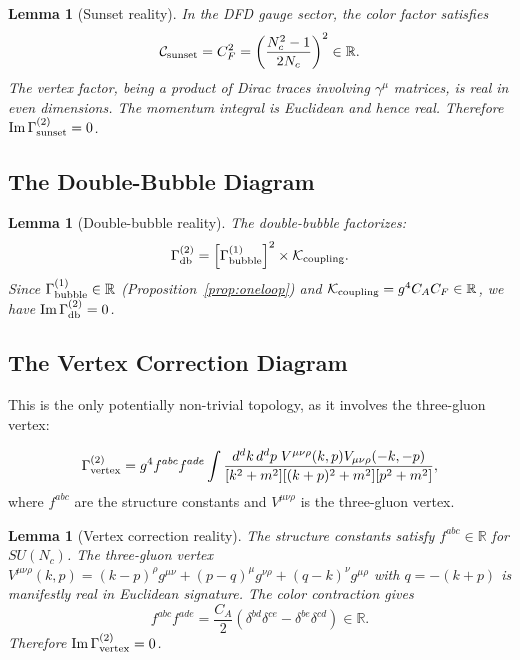\documentclass[11pt,a4paper]{article}
\newtheorem{lemma}[theorem]{Lemma}
\theoremstyle{remark}
\begin{document}
\begin{lemma}[Sunset reality]
\label{lem:sunset}
In the DFD gauge sector, the color factor satisfies
\begin{equation}
\mathcal{C}_{\rm sunset} = C_F^2 = \left(\frac{N_c^2-1}{2N_c}\right)^2 \in \mathbb{R}.
\end{equation}
The vertex factor, being a product of Dirac traces involving $\gamma^\mu$
matrices, is real in even dimensions. The momentum integral is Euclidean
and hence real. Therefore $\mathrm{Im}\,\Gamma^{(2)}_{\rm sunset} = 0$.
\end{lemma}

\subsection{The Double-Bubble Diagram}

\begin{lemma}[Double-bubble reality]
\label{lem:doublebubble}
The double-bubble factorizes:
\begin{equation}
\Gamma^{(2)}_{\rm db} = \left[\Gamma^{(1)}_{\rm bubble}\right]^2 \times \mathcal{K}_{\rm coupling}.
\end{equation}
Since $\Gamma^{(1)}_{\rm bubble} \in \mathbb{R}$ (Proposition~\ref{prop:oneloop})
and $\mathcal{K}_{\rm coupling} = g^4 C_A C_F \in \mathbb{R}$, we have
$\mathrm{Im}\,\Gamma^{(2)}_{\rm db} = 0$.
\end{lemma}

\subsection{The Vertex Correction Diagram}

This is the only potentially non-trivial topology, as it involves the
three-gluon vertex:

\begin{equation}
\Gamma^{(2)}_{\rm vertex} = g^4 f^{abc}f^{ade}
  \int \frac{d^dk\,d^dp\; V^{\mu\nu\rho}(k,p)V_{\mu\nu\rho}(-k,-p)}
  {[k^2+m^2][(k+p)^2+m^2][p^2+m^2]},
\end{equation}
where $f^{abc}$ are the structure constants and $V^{\mu\nu\rho}$ is the
three-gluon vertex.

\begin{lemma}[Vertex correction reality]
\label{lem:vertex}
The structure constants satisfy $f^{abc} \in \mathbb{R}$ for $SU(N_c)$.
The three-gluon vertex $V^{\mu\nu\rho}(k,p) = (k-p)^\rho g^{\mu\nu}
+ (p-q)^\mu g^{\nu\rho} + (q-k)^\nu g^{\mu\rho}$ with $q = -(k+p)$
is manifestly real in Euclidean signature. The color contraction gives
\begin{equation}
f^{abc}f^{ade} = \frac{C_A}{2}(\delta^{bd}\delta^{ce} - \delta^{be}\delta^{cd}) \in \mathbb{R}.
\end{equation}
Therefore $\mathrm{Im}\,\Gamma^{(2)}_{\rm vertex} = 0$.
\end{lemma}
\end{document}
